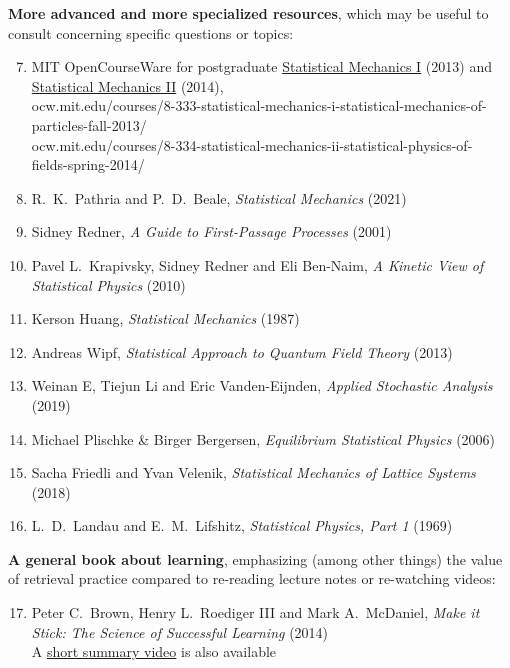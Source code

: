 \noindent\textbf{More advanced and more specialized resources}, which may be useful to consult concerning specific questions or topics: \\[-24 pt]
\begin{enumerate}
  \setcounter{enumi}{6}
  \item MIT OpenCourseWare for postgraduate \href{https://ocw.mit.edu/courses/8-333-statistical-mechanics-i-statistical-mechanics-of-particles-fall-2013/}{Statistical Mechanics I} (2013) and \href{https://ocw.mit.edu/courses/8-334-statistical-mechanics-ii-statistical-physics-of-fields-spring-2014/}{Statistical Mechanics II} (2014), \\ ocw.mit.edu/courses/8-333-statistical-mechanics-i-statistical-mechanics-of- \\ particles-fall-2013/ \\ ocw.mit.edu/courses/8-334-statistical-mechanics-ii-statistical-physics-of- \\ fields-spring-2014/
  \item R.~K.~Pathria and P.~D.~Beale, \textit{Statistical Mechanics} (2021)
  \item Sidney Redner, \textit{A Guide to First-Passage Processes} (2001)
  \item Pavel L.~Krapivsky, Sidney Redner and Eli Ben-Naim, \textit{A Kinetic View of Statistical Physics} (2010)
  \item Kerson Huang, \textit{Statistical Mechanics} (1987)
  \item Andreas Wipf, \textit{Statistical Approach to Quantum Field Theory} (2013)
  \item Weinan E, Tiejun Li and Eric Vanden-Eijnden, \textit{Applied Stochastic Analysis} (2019)
  \item Michael Plischke \& Birger Bergersen, \textit{Equilibrium Statistical Physics} (2006)
  \item Sacha Friedli and Yvan Velenik, \textit{Statistical Mechanics of Lattice Systems} (2018)
  \item L.~D.~Landau and E.~M.~Lifshitz, \textit{Statistical Physics, Part 1} (1969)
\end{enumerate}

\newpage %
\noindent\textbf{A general book about learning}, emphasizing (among other things) the value of retrieval practice compared to re-reading lecture notes or re-watching videos: \\[-24 pt]
\begin{enumerate}
  \setcounter{enumi}{16}
  \item Peter C.~Brown, Henry L.~Roediger III and Mark A.~McDaniel, \textit{Make it Stick: The Science of Successful Learning} (2014) \\
        A \href{https://www.youtube.com/watch?v=MfylloWuuZU}{short summary video} is also available
\end{enumerate}

